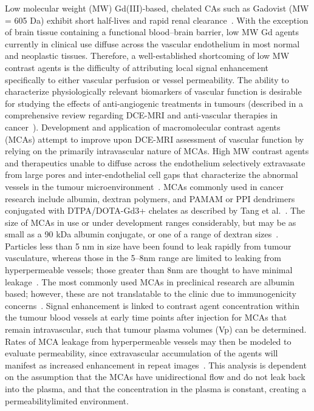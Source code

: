 Low molecular weight (MW) Gd(III)-based, chelated CAs such as Gadovist (MW = 605 Da) exhibit short half-lives and rapid renal clearance~\cite{Weinmann:1984gv}.
With the exception of brain tissue containing a functional blood–brain barrier, low MW Gd agents currently in clinical use diffuse across the vascular endothelium in most normal and neoplastic tissues.
Therefore, a well-established shortcoming of low MW contrast agents is the difficulty of attributing local signal enhancement specifically to either vascular perfusion or vessel permeability.
The ability to characterize physiologically relevant biomarkers of vascular function is desirable for studying the effects of anti-angiogenic treatments in tumours (described in a comprehensive review regarding DCE-MRI and anti-vascular therapies in cancer~\cite{OConnor:2012ie}).
Development and application of macromolecular contrast agents (MCAs) attempt to improve upon DCE-MRI assessment of vascular function by relying on the primarily intravascular nature of MCAs.
High MW contrast agents and therapeutics unable to diffuse across the endothelium selectively extravasate from large pores and inter-endothelial cell gaps that characterize the abnormal vessels in the tumour microenvironment~\cite{McDonald:2002ut,Hashizume:2000bq}.
MCAs commonly used in cancer research include albumin, dextran polymers, and PAMAM or PPI dendrimers conjugated with DTPA/DOTA-Gd3+ chelates as described by Tang et al.~\cite{Tang:2013fi}.
The size of MCAs in use or under development ranges considerably, but may be as small as a 90 kDa albumin conjugate, or one of a range of dextran sizes~\cite{Barrett:2006jx}.
Particles less than 5 nm in size have been found to leak rapidly from tumour vasculature, whereas those in the 5–8nm range are limited to leaking from hyperpermeable vessels; those greater than 8nm are thought to have minimal leakage~\cite{Kobayashi:2004vq,Sato:2001tt}.
The most commonly used MCAs in preclinical research are albumin based; however, these are not translatable to the clinic due to immunogenicity concerns~\cite{Ogan:1987tg}.
Signal enhancement is linked to contrast agent concentration within the tumour blood vessels at early time points after injection for MCAs that remain intravascular, such that tumour plasma volumes (Vp) can be determined.
Rates of MCA leakage from hyperpermeable vessels may then be modeled to evaluate permeability, since extravascular accumulation of the agents will manifest as increased enhancement in repeat images~\cite{Ogan:1987tg,Turetschek:2004bw}.
This analysis is dependent on the assumption that the MCAs have unidirectional flow and do not leak back into the plasma, and that the concentration in the plasma is constant, creating a permeabilitylimited environment.
